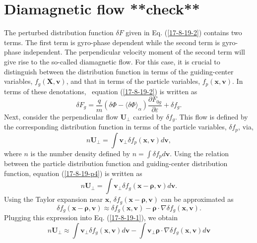\documentclass{llncs}
\newcommand{\tmmathbf}[1]{\ensuremath{\boldsymbol{#1}}}
\begin{document}
\section{Diamagnetic flow **check**}\label{17-9-26-1}\label{17-8-19-e1}

The perturbed distribution function $\delta F$ given in Eq. (\ref{17-8-19-2})
contains two terms. The first term is gyro-phase dependent while the second
term is gyro-phase independent. The perpendicular velocity moment of the
second term will give rise to the so-called diamagnetic flow. For this case,
it is crucial to distinguish between the distribution function in terms of the
guiding-center variables, $f_g (\mathbf{X}, \mathbf{v})$, and that in terms of
the particle variables, $f_p (\mathbf{x}, \mathbf{v})$. In terms of these
denotations, \ equation (\ref{17-8-19-2}) is written as
\begin{equation}
  \delta F_g = \frac{q}{m} (\delta \Phi - \langle \delta \Phi
  \rangle_{\alpha}) \frac{\partial F_{0 g}}{\partial \varepsilon} + \delta f_g
  .
\end{equation}
Next, consider the perpendicular flow $\mathbf{U}_{\perp}$ carried by $\delta
f_g$. This flow is defined by the corresponding distribution function in terms
of the particle variables, $\delta f_p$, via,
\begin{equation}
  \label{17-8-19-p4} n\mathbf{U}_{\perp} = \int \mathbf{v}_{\perp} \delta f_p
  (\mathbf{x}, \mathbf{v}) d\mathbf{v},
\end{equation}
where $n$ is the number density defined by $n = \int \delta f_p d\mathbf{v}$.
Using the relation between the particle distribution function and
guiding-center distribution function, equation (\ref{17-8-19-p4}) is written
as
\begin{equation}
  \label{17-8-19-1} n\mathbf{U}_{\perp} = \int \mathbf{v}_{\perp} \delta f_g
  (\mathbf{x}-\tmmathbf{\rho}, \mathbf{v}) d\mathbf{v}.
\end{equation}
Using the Taylor expansion near $\mathbf{x}$, $\delta f_g
(\mathbf{x}-\tmmathbf{\rho}, \mathbf{v})$ can be approximated as
\begin{equation}
  \delta f_g (\mathbf{x}-\tmmathbf{\rho}, \mathbf{v}) \approx \delta f_g
  (\mathbf{x}, \mathbf{v}) -\tmmathbf{\rho} \cdot \nabla \delta f_g
  (\mathbf{x}, \mathbf{v}) .
\end{equation}
Plugging this expression into Eq. (\ref{17-8-19-1}), we obtain
\begin{equation}
  \label{17-8-19-3} n\mathbf{U}_{\perp} \approx \int \mathbf{v}_{\perp} \delta
  f_g (\mathbf{x}, \mathbf{v}) d\mathbf{v}- \int \mathbf{v}_{\perp}
  \tmmathbf{\rho} \cdot \nabla \delta f_g (\mathbf{x}, \mathbf{v}) d\mathbf{v}
\end{equation}
\end{document}

